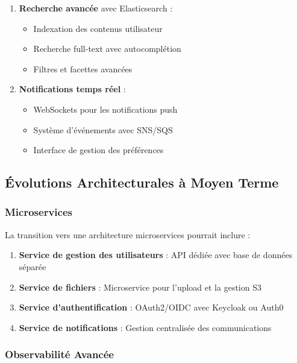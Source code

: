 \begin{enumerate}
    \item \textbf{Recherche avancée} avec Elasticsearch :
    \begin{itemize}
        \item Indexation des contenus utilisateur
        \item Recherche full-text avec autocomplétion
        \item Filtres et facettes avancées
    \end{itemize}
    
    \item \textbf{Notifications temps réel} :
    \begin{itemize}
        \item WebSockets pour les notifications push
        \item Système d'événements avec SNS/SQS
        \item Interface de gestion des préférences
    \end{itemize}
\end{enumerate}

\subsection{Évolutions Architecturales à Moyen Terme}

\subsubsection{Microservices}

La transition vers une architecture microservices pourrait inclure :

\begin{enumerate}
    \item \textbf{Service de gestion des utilisateurs} : API dédiée avec base de données séparée
    \item \textbf{Service de fichiers} : Microservice pour l'upload et la gestion S3
    \item \textbf{Service d'authentification} : OAuth2/OIDC avec Keycloak ou Auth0
    \item \textbf{Service de notifications} : Gestion centralisée des communications
\end{enumerate}

\subsubsection{Observabilité Avancée}

